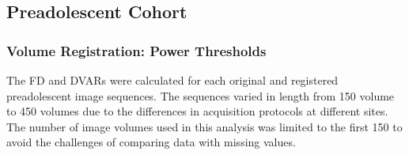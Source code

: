 \subsection{Preadolescent Cohort}

\subsubsection{Volume Registration: Power Thresholds}

The FD and DVARs were calculated for each original and registered preadolescent image sequences. The sequences varied in length from 150 volume to 450 volumes due to the differences in acquisition protocols at different sites. The number of image volumes used in this analysis was limited to the first 150 to avoid the challenges of comparing data with missing values.

